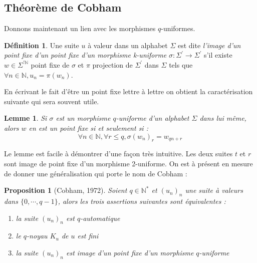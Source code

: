 \documentclass[12pt]{article}
\theoremstyle{plain}
\newtheorem{lemme}[theoreme]{Lemme}
\newtheorem{proposition}[theoreme]{Proposition}
\theoremstyle{definition}
\newtheorem{definition}[theoreme]{D\'efinition}
\theoremstyle{remark}
\begin{document}
\subsection{Th\'eor\`eme de Cobham}

Donnons maintenant un lien avec les morphismes $q$-uniformes.

\begin{definition}
  Une suite $u$ \`a valeur dans un alphabet $\Sigma$ est dite \textit{l'image d'un point fixe 
  d'un point fixe d'un morphisme k-uniforme} $\sigma : \Sigma^{'}\rightarrow\Sigma^{'}$ s'il 
  existe $w\in\Sigma^{'\mathbb{N}}$ point fixe de $\sigma$ et $\pi$ projection de
  $\Sigma^{'}$ dans $\Sigma$ tels que $\forall{n}\in\mathbb{N},u_{n}=\pi(w_{n})$.
\end{definition}

En \'ecrivant le fait d'\^etre un point fixe lettre \`a lettre on obtient la caract\'erisation suivante qui sera souvent utile.

\begin{lemme}\label{uniforme}
  Si $\sigma$ est un morphisme $q$-uniforme d'un alphabet $\Sigma$ dans lui m\^eme, alors $w$ 
  en est un point fixe si et seulement si :
  \begin{displaymath}
    \forall{n}\in\mathbb{N},\forall{r}\le{q},\sigma(w_{n})_{r}=w_{qn+r}
  \end{displaymath}
\end{lemme}

Le lemme est facile \`a d\'emontrer d'une fa\c con tr\`es intuitive. Les deux suites $t$ et $r$ sont image de point fixe d'un morphisme 2-uniforme. On est \`a pr\'esent en mesure de donner une g\'en\'eralisation qui porte le nom de Cobham :

\begin{proposition}[Cobham, 1972]
  Soient $q\in\mathbb{N^*}$ et $(u_{n})_{n}$ une suite \`a valeurs dans $\{0,\cdots,q-1\}$,
  alors les trois assertions suivantes sont \'equivalentes :
  \begin{enumerate}
  \item la suite $(u_{n})_{n}$ est $q$-automatique
  \item le $q$-noyau $K_u$ de $u$ est fini
  \item la suite $(u_{n})_{n}$ est image d'un point fixe d'un morphisme $q$-uniforme
  \end{enumerate}
\end{proposition}  
\end{document}
